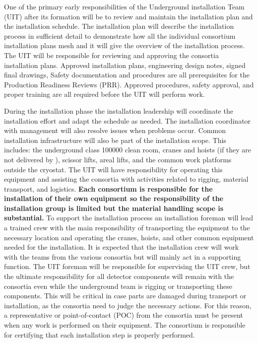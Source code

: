 One of the primary early responsibilities of the Underground
installation Team (UIT) after its formation will be to review and
maintain the  installation plan and the installation
schedule. The  installation plan will describe the
installation process in sufficient detail to demonstrate how all the
individual consortium installation plans mesh and it will give the
overview of the installation process. The UIT will be responsible for
reviewing and approving the consortia installation plans. Approved
installation plans, engineering design notes, signed final drawings,
Safety documentation and procedures are all prerequisites for the
Production Readiness Reviews (PRR). Approved procedures, safety
approval, and proper training are all required before the UIT will
perform work.
  
During the installation phase the installation leadership will
coordinate the  installation effort and adapt the schedule as
needed. The installation coordinator with management will also resolve
issues when problems occur. Common installation infrastructure will
also be part of the installation scope. This includes: the underground
class \num{100000} clean room, cranes and hoists (if they are not delivered by
), scissor lifts, areal lifts, and the common work platforms
outside the cryostat. The UIT will have responsibility for operating
this equipment and assisting the consortia with activities related to
rigging, material transport, and logistics. {\bf Each consortium is
  responsible for the installation of their own equipment so the
  responsibility of the installation group is limited but the material
  handling scope is substantial.} To support the installation process
an installation foreman will lead a trained crew with the main
responsibility of transporting the equipment to the necessary location
and operating the cranes, hoists, and other common equipment needed
for the installation. It is expected that the installation crew will
work with the teams from the various consortia but will mainly act in
a supporting function. The UIT foreman will be responsible for
supervising the UIT crew, but the ultimate responsibility for all
detector components will remain with the consortia even while the
underground team is rigging or transporting these components.  This
will be critical in case parts are damaged during transport or
installation, as the consortia need to judge the necessary
actions. For this reason, a representative or point-of-contact (POC)
from the consortia must be present when any work is performed on their
equipment. The consortium is responsible for certifying that each
installation step is properly performed.

